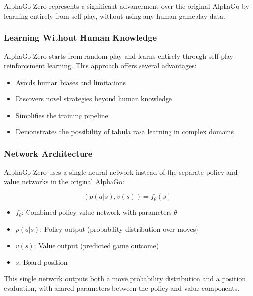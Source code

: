 \documentclass[11pt]{article}
\begin{document}
AlphaGo Zero represents a significant advancement over the original AlphaGo by learning entirely from self-play, without using any human gameplay data.

\subsubsection{Learning Without Human Knowledge}

AlphaGo Zero starts from random play and learns entirely through self-play reinforcement learning. This approach offers several advantages:

\begin{itemize}
    \item Avoids human biases and limitations
    \item Discovers novel strategies beyond human knowledge
    \item Simplifies the training pipeline
    \item Demonstrates the possibility of tabula rasa learning in complex domains
\end{itemize}

\subsubsection{Network Architecture}

AlphaGo Zero uses a single neural network instead of the separate policy and value networks in the original AlphaGo:

\begin{equation}
    (p(a|s), v(s)) = f_\theta(s)
\end{equation}

\begin{tcolorbox}[title=Notation Overview]
\begin{itemize}
    \item $f_\theta$: Combined policy-value network with parameters $\theta$
    \item $p(a|s)$: Policy output (probability distribution over moves)
    \item $v(s)$: Value output (predicted game outcome)
    \item $s$: Board position
\end{itemize}
\end{tcolorbox}

This single network outputs both a move probability distribution and a position evaluation, with shared parameters between the policy and value components.
\end{document}

